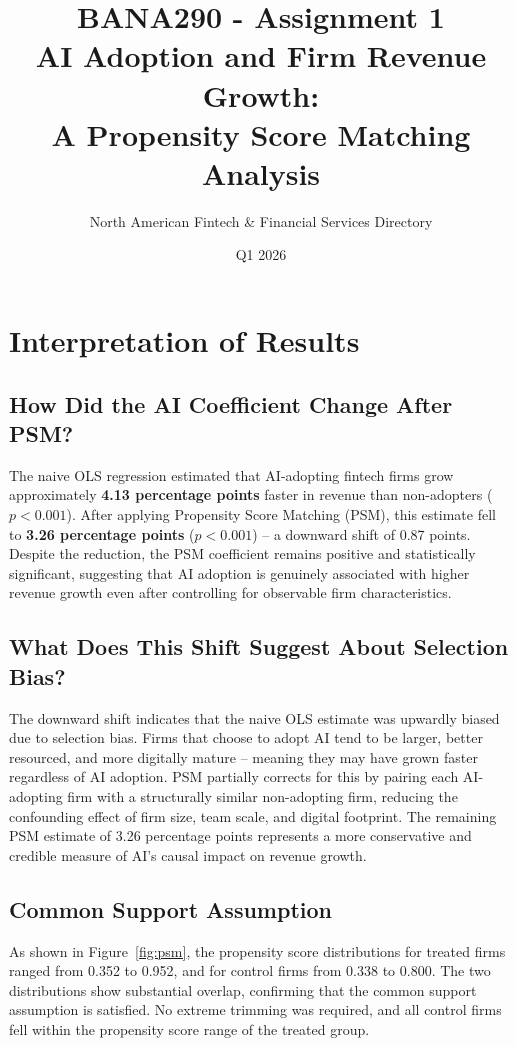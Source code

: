 \documentclass[12pt]{article}
\title{\textbf{BANA290 - Assignment 1} \\ 
       \large AI Adoption and Firm Revenue Growth: \\
       A Propensity Score Matching Analysis}
\author{North American Fintech \& Financial Services Directory}
\date{Q1 2026}
\begin{document}
\maketitle

\section*{Interpretation of Results}

\subsection*{How Did the AI Coefficient Change After PSM?}

The naive OLS regression estimated that AI-adopting fintech firms 
grow approximately \textbf{4.13 percentage points} faster in revenue 
than non-adopters ($p < 0.001$). After applying Propensity Score 
Matching (PSM), this estimate fell to \textbf{3.26 percentage points} 
($p < 0.001$) -- a downward shift of 0.87 points. Despite the 
reduction, the PSM coefficient remains positive and statistically 
significant, suggesting that AI adoption is genuinely associated 
with higher revenue growth even after controlling for observable 
firm characteristics.

\subsection*{What Does This Shift Suggest About Selection Bias?}

The downward shift indicates that the naive OLS estimate was upwardly 
biased due to selection bias. Firms that choose to adopt AI tend to 
be larger, better resourced, and more digitally mature -- meaning 
they may have grown faster regardless of AI adoption. PSM partially 
corrects for this by pairing each AI-adopting firm with a 
structurally similar non-adopting firm, reducing the confounding 
effect of firm size, team scale, and digital footprint. The remaining 
PSM estimate of 3.26 percentage points represents a more conservative 
and credible measure of AI's causal impact on revenue growth.

\subsection*{Common Support Assumption}

As shown in Figure~\ref{fig:psm}, the propensity score distributions 
for treated firms ranged from 0.352 to 0.952, and for control firms 
from 0.338 to 0.800. The two distributions show substantial overlap, 
confirming that the common support assumption is satisfied. No 
extreme trimming was required, and all control firms fell within the 
propensity score range of the treated group.
\end{document}
